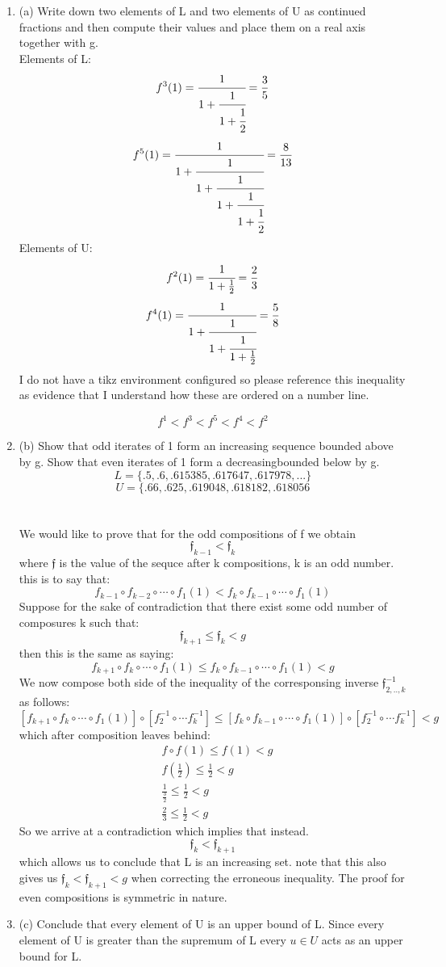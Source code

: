 \documentclass[11pt]{article}
\theoremstyle{definition}  %
\begin{document}
\begin{enumerate}
  \item (a) Write down two elements of L and two elements of U as continued
  fractions and then compute their values and place them on a real
  axis together with g.\\
  Elements of L:
  \[
    f^3(1)=\cfrac{1}{1+\cfrac{1}{1+\cfrac{1}{2}}}=\frac{3}{5}
  \]
  \[
    f^5(1)=\cfrac{1}{1+\cfrac{1}{1+\cfrac{1}{1+\cfrac{1}{1+\cfrac{1}{2}}}}}=\frac{8}{13}
  \]
  Elements of U:\[
    f^2(1)=\cfrac{1}{1+\frac{1}{2}}=\frac{2}{3}
  \]
  \[
    f^4(1)=\cfrac{1}{1+\cfrac{1}{1+\cfrac{1}{1+\frac{1}{2}}}}=\frac{5}{8}
  \]
  I do not have a tikz environment configured so please reference this inequality as evidence that I understand how these are ordered on a number line.

  \[
    f^1<f^3<f^5<f^4<f^2
  \]
  \item (b) Show that odd iterates of 1 form an increasing sequence bounded
  above by g. Show that even iterates of 1 form a decreasingbounded below by g.\\
  \[
    L=\{.5,.6,.615385,.617647,.617978,...\}
  \]
  \[
    U=\{.66,.625,.619048,.618182,.618056
  \]
  \\\\
  We would like to prove that for the odd compositions of f we obtain
  \[
    \mathfrak{f}_{k-1}<\mathfrak{f}_k
  \]
where $\mathfrak{f}$ is the value of the sequce after k compositions, k is an odd number.
  this is to say that:
  \[
    f_{k-1}\circ f_{k-2}\circ \cdots \circ f_1(1)<f_{k}\circ f_{k-1}\circ \cdots \circ f_1(1)
  \]
Suppose for the sake of contradiction that there exist some odd number of composures k such that:
\[
  \mathfrak{f}_{k+1}\leq\mathfrak{f}_k<g
\]
then this is the same as saying:
\[
    f_{k+1}\circ f_{k}\circ \cdots \circ f_1(1)\leq f_{k}\circ f_{k-1}\circ \cdots \circ f_1(1)<g
\]
We now compose both side of the inequality of the corresponsing inverse $\mathfrak{f}^{-1}_{2,..,k}$ as follows:
\[
  \left[ f_{k+1}\circ f_{k}\circ \cdots \circ f_1(1)\right]\circ \left[f_2^{-1}\circ \cdots f_k^{-1}\right] \leq \left[ f_{k}\circ f_{k-1}\circ \cdots \circ f_1(1)\right]\circ \left[f_2^{-1}\circ \cdots f_k^{-1}\right]<g
\]
which after composition leaves behind:
\begin{align*}
  &  f\circ f(1)\leq f(1)<g\\
  &   f(\frac{1}{2})\leq \frac{1}{2}<g\\
  &\frac{1}{\frac{3}{2}}\leq \frac{1}{2}<g\\
  &\frac{2}{3}\leq \frac{1}{2}<g
\end{align*}
So we arrive at a contradiction which implies that instead.\[
   \mathfrak{f}_k< \mathfrak{f}_{k+1}
\]
which allows us to conclude that L is an increasing set. note that this also gives us $ \mathfrak{f}_k< \mathfrak{f}_{k+1}<g$ when correcting the erroneous inequality. The proof for even compositions is symmetric in nature.
  \item (c) Conclude that every element of U is an upper bound of L.
  Since every element of U is greater than the supremum of L every $u\in U$ acts as an upper bound for L.



\end{enumerate}
\end{document}
